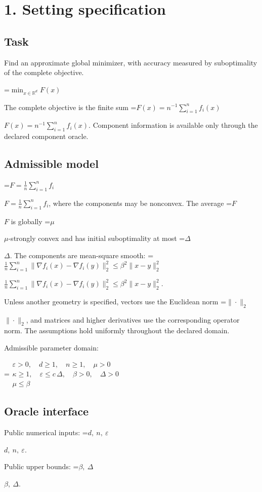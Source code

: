 \documentclass[10pt,a4paper]{article}
\newcommand{\AtlasMath}[1]{\par\begingroup\centering\setbox0=\hbox{$\displaystyle #1$}\ifdim\wd0>1.4\linewidth\typeout{ATLAS WIDE FORMULA: \the\wd0}\fi\ifdim\wd0>\linewidth\resizebox{\linewidth}{!}{\box0}\else\box0\fi\par\endgroup}
\newcommand{\AtlasInlineMath}[1]{\begingroup\setbox0=\hbox{$#1$}\ifdim\wd0>.4\linewidth\endgroup\AtlasMath{#1}\else\endgroup$#1$\fi}
\begin{document}
\section{1. Setting specification}
\subsection{Task}
Find an approximate global minimizer, with accuracy measured by suboptimality of the complete objective.


\AtlasMath{\min_{x\in \mathbb{R}^d}F(x)}


The complete objective is the finite sum \AtlasInlineMath{F(x)=n^{-1}\sum_{i=1}^n f_i(x)}. Component information is available only through the declared component oracle.

\subsection{Admissible model}
\AtlasInlineMath{F=\frac1n\sum_{i=1}^n f_i}, where the components may be nonconvex. The average \AtlasInlineMath{F} is globally \AtlasInlineMath{\mu}-strongly convex and has initial suboptimality at most \AtlasInlineMath{\Delta}. The components are mean-square smooth: \AtlasInlineMath{\frac1n\sum_{i=1}^n\|\nabla f_i(x)-\nabla f_i(y)\|_2^2\le\beta^2\|x-y\|_2^2}.

Unless another geometry is specified, vectors use the Euclidean norm \AtlasInlineMath{\|\cdot\|_2}, and matrices and higher derivatives use the corresponding operator norm. The assumptions hold uniformly throughout the declared domain.

Admissible parameter domain:


\AtlasMath{\begin{gathered}\varepsilon > 0,\quad d \ge 1,\quad n \ge 1,\quad \mu > 0\\\kappa \ge 1,\quad \varepsilon \le c\,\Delta,\quad \beta > 0,\quad \Delta > 0\\\mu \le \beta\end{gathered}}


\subsection{Oracle interface}
Public numerical inputs: \AtlasInlineMath{d,\ n,\ \varepsilon}.

Public upper bounds: \AtlasInlineMath{\beta,\ \Delta}.
\end{document}
